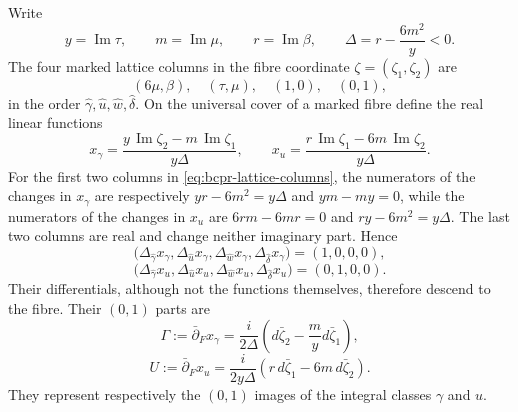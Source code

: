 Write
\begin{equation}
 y=\operatorname{Im}\tau,
 \qquad m=\operatorname{Im}\mu,
 \qquad r=\operatorname{Im}\beta,
 \qquad \Delta=r-\frac{6m^2}{y}<0.
\label{eq:bcpr-delta}
\end{equation}
The four marked lattice columns in the fibre coordinate
$\zeta=(\zeta_1,\zeta_2)$ are
\begin{equation}
 (6\mu,\beta),\quad(\tau,\mu),\quad(1,0),\quad(0,1),
\label{eq:bcpr-lattice-columns}
\end{equation}
in the order $\widehat\gamma,\widehat u,\widehat w,
\widehat\delta$.  On the universal cover of a marked fibre define the
real linear functions
\begin{equation}
 x_\gamma=
 \frac{y\,\operatorname{Im}\zeta_2-m\,\operatorname{Im}\zeta_1}
      {y\Delta},
 \qquad
 x_u=
 \frac{r\,\operatorname{Im}\zeta_1-6m\,\operatorname{Im}\zeta_2}
      {y\Delta}.
\label{eq:bcpr-real-linear-functions}
\end{equation}
For the first two columns in \cref{eq:bcpr-lattice-columns}, the numerators
of the changes in $x_\gamma$ are respectively
$yr-6m^2=y\Delta$ and $ym-my=0$, while the numerators of the changes in
$x_u$ are $6rm-6mr=0$ and $ry-6m^2=y\Delta$.  The last two columns are
real and change neither imaginary part.  Hence
\[
 \bigl(\Delta_{\widehat\gamma}x_\gamma,
       \Delta_{\widehat u}x_\gamma,
       \Delta_{\widehat w}x_\gamma,
       \Delta_{\widehat\delta}x_\gamma\bigr)=(1,0,0,0),
\]
\begin{equation}
 \bigl(\Delta_{\widehat\gamma}x_u,
       \Delta_{\widehat u}x_u,
       \Delta_{\widehat w}x_u,
       \Delta_{\widehat\delta}x_u\bigr)=(0,1,0,0).
\label{eq:bcpr-linear-function-increments}
\end{equation}
Their differentials, although not the functions themselves, therefore
descend to the fibre.  Their $(0,1)$ parts are
\begin{equation}
 \Gamma:=\bar\partial_Fx_\gamma
 =\frac{i}{2\Delta}
 \left(d\bar\zeta_2-\frac{m}{y}d\bar\zeta_1\right),
\label{eq:bcpr-gamma-form}
\end{equation}
\begin{equation}
 U:=\bar\partial_Fx_u
 =\frac{i}{2y\Delta}
 \left(r\,d\bar\zeta_1-6m\,d\bar\zeta_2\right).
\label{eq:bcpr-u-form}
\end{equation}
They represent respectively the $(0,1)$ images of the integral classes
$\gamma$ and $u$.

